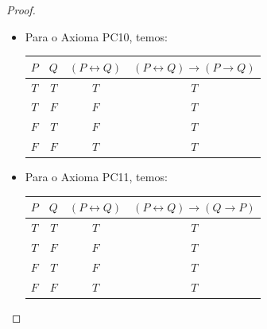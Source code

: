\begin{proof}
\begin{itemize}
\begin{center}
            \begin{tabular}{c|c|c|c|c|c|c}
                $P$ & $Q$ & $R$ & $P\lor Q$ & $P \rightarrow R$ & $Q \rightarrow R$ & (PC9) \\
                \hline
                $T$ & $T$ & $T$ & $T$ & $T$ & $T$ & $T$ \\
                $T$ & $T$ & $F$ & $T$ & $F$ & $F$ & $T$ \\
                $T$ & $F$ & $T$ & $T$ & $T$ & $T$ & $T$ \\
                $T$ & $F$ & $F$ & $T$ & $F$ & $T$ & $T$ \\
                $F$ & $T$ & $T$ & $T$ & $T$ & $T$ & $T$ \\
                $F$ & $T$ & $F$ & $T$ & $T$ & $F$ & $T$ \\
                $F$ & $F$ & $T$ & $F$ & $T$ & $T$ & $T$ \\
                $F$ & $F$ & $F$ & $F$ & $T$ & $T$ & $T$
            \end{tabular}
        \end{center}
        \item Para o Axioma PC10, temos:
        \begin{center}
            \begin{tabular}{c|c|c|c}
                $P$ & $Q$ & $(P \leftrightarrow Q)$ & $(P \leftrightarrow Q) \rightarrow (P \rightarrow Q)$ \\
                \hline
                $T$ & $T$ & $T$ & $T$ \\
                $T$ & $F$ & $F$ & $T$ \\
                $F$ & $T$ & $F$ & $T$ \\
                $F$ & $F$ & $T$ & $T$
            \end{tabular}
        \end{center}
        \item Para o Axioma PC11, temos:
        \begin{center}
            \begin{tabular}{c|c|c|c}
                $P$ & $Q$ & $(P \leftrightarrow Q)$ & $(P \leftrightarrow Q) \rightarrow (Q \rightarrow P)$ \\
                \hline
                $T$ & $T$ & $T$ & $T$ \\
                $T$ & $F$ & $F$ & $T$ \\
                $F$ & $T$ & $F$ & $T$ \\
                $F$ & $F$ & $T$ & $T$
            \end{tabular}

\end{center}
\end{itemize}
\end{proof}
